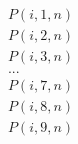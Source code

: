 \documentclass[preview]{standalone}
\begin{document}
\begin{align*}
P(i,1,n)\\P(i,2,n)\\P(i,3,n)\\...\\P(i,7,n)\\P(i,8,n)\\P(i,9,n)
\end{align*}
\end{document}

